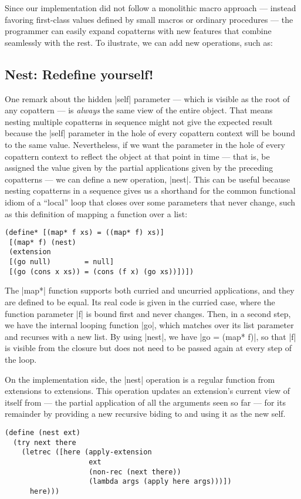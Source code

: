 Since our implementation did not follow a monolithic macro approach --- instead favoring first-class values defined by small macros or ordinary procedures --- the programmer can easily expand copatterns with new features that combine seamlessly with the rest.
To ilustrate, we can add new operations, such as:

\subsection{Nest: Redefine yourself!}
One remark about the hidden \scm|self| parameter --- which is visible as the root of any copattern --- is \emph{always} the same view of the entire object.
That means nesting multiple copatterns in sequence might not give the expected result because the \scm|self| parameter in the hole of every copattern context will be bound to the same value.
Nevertheless, if we want the parameter in the hole of every copattern context to reflect the object at that point in time --- that is, be assigned the value given by the partial applications given by the preceding copatterns --- we can define a new operation, \scm|nest|.
This can be useful because nesting copatterns in a sequence gives us a shorthand for the common functional idiom of a ``local'' loop that closes over some parameters that never change, such as this definition of mapping a function over a list:
\begin{verbatim}
(define* [(map* f xs) = ((map* f) xs)]
 [(map* f) (nest)
 (extension
 [(go null)        = null]
 [(go (cons x xs)) = (cons (f x) (go xs))])])
\end{verbatim}
The \scm|map*| function supports both curried and uncurried applications, and they are defined to be equal.
Its real code is given in the curried case, where the function parameter \scm|f| is bound first and never changes.
Then, in a second step, we have the internal looping function \scm|go|, which matches over its list parameter and recurses with a new list.
By using \scm|nest|, we have \scm|go = (map* f)|, so that \scm|f| is visible from the closure but does not need to be passed again at every step of the loop.

On the implementation side, the \scm|nest| operation is a regular function from extensions to extensions.
This operation updates an extension's current view of itself from  --- the partial application of all the arguments seen so far --- for its remainder by providing a new recursive biding to  and using it as the new self.
\begin{verbatim}
(define (nest ext)
  (try next there
    (letrec ([here (apply-extension
                    ext
                    (non-rec (next there))
                    (lambda args (apply here args)))])
      here)))
\end{verbatim}

